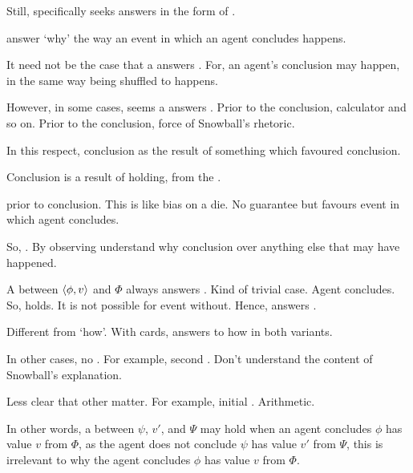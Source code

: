 \begin{note}
  Still, \qWhy{} specifically seeks answers in the form of .

  \ros{} answer `why' the way an event in which an agent concludes happens.

  It need not be the case that a \ros{} answers \qWhy{}.
  For, an agent's conclusion may happen, in the same way \mainCard{} being shuffled to \mainCardPos{} happens.

  However, in some cases, seems a \ros{} answers \qWhy{}.
  Prior to the conclusion, calculator and so on.
  Prior to the conclusion, force of Snowball's rhetoric.

  In this respect, conclusion as the result of something which favoured conclusion.

  Conclusion is a result of \ros{} holding, from the \agpe{}.

  \ros{} prior to conclusion.
  This is like bias on a die.
  No guarantee but favours event in which agent concludes.
\end{note}


\begin{note}
  So, \qWhy{}.
  By observing  understand why conclusion over anything else that may have happened.

  A \ros{} between \(\langle \phi, v \rangle\) and \(\Phi\) always answers \qWhy{}.
  Kind of trivial case.
  Agent concludes.
  So, \ros{} holds.
  It is not possible for event without.
  Hence, answers \qWhy{}.
\end{note}


\begin{note}
  Different from `how'.
  With cards, answers to how in both variants.
\end{note}


\begin{note}
  In other cases, no \ros{}.
  For example, second \scen{}.
  Don't understand the content of Snowball's explanation.

  Less clear that other \ros{} matter.
  For example, initial \scen{}.
  Arithmetic.

  In other words, a \ros{} between \(\psi\), \(v'\), and \(\Psi\) may hold when an agent concludes \(\phi\) has value \(v\) from \(\Phi\), as the agent does not conclude \(\psi\) has value \(v'\) from \(\Psi\), this \ros{} is irrelevant to why the agent concludes \(\phi\) has value \(v\) from \(\Phi\).
\end{note}


